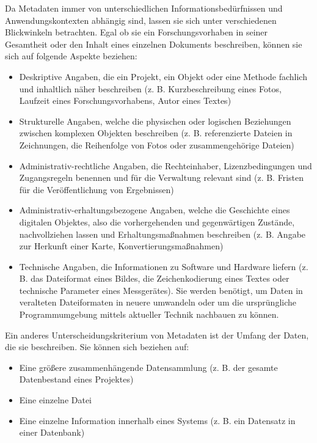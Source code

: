 Da Metadaten immer von unterschiedlichen Informationsbedürfnissen und Anwendungskontexten abhängig sind, lassen sie sich unter verschiedenen Blickwinkeln betrachten. Egal ob sie ein Forschungsvorhaben in seiner Gesamtheit oder den Inhalt eines einzelnen Dokuments beschreiben, können sie sich auf folgende Aspekte beziehen:
\begin{itemize}
	\item Deskriptive Angaben, die ein Projekt, ein Objekt oder eine Methode fachlich und inhaltlich näher beschreiben (z. B. Kurzbeschreibung eines Fotos, Laufzeit eines Forschungsvorhabens, Autor eines Textes)
	\item Strukturelle Angaben, welche die physischen oder logischen Beziehungen zwischen komplexen Objekten beschreiben (z. B. referenzierte Dateien in Zeichnungen, die Reihenfolge von Fotos oder zusammengehörige Dateien)
	\item Administrativ-rechtliche Angaben, die Rechteinhaber, Lizenzbedingungen und Zugangsregeln benennen und für die Verwaltung relevant sind (z. B. Fristen für die Veröffentlichung von Ergebnissen)
	\item Administrativ-erhaltungsbezogene Angaben, welche die Geschichte eines digitalen Objektes, also die  vorhergehenden und gegenwärtigen Zustände, nachvollziehen lassen und Erhaltungsmaßnahmen beschreiben (z. B. Angabe zur Herkunft einer Karte, Konvertierungsmaßnahmen)
	\item Technische Angaben, die Informationen zu Software und Hardware liefern (z. B. das Dateiformat eines Bildes, die Zeichenkodierung eines Textes oder technische Parameter eines Messgerätes). Sie werden benötigt, um Daten in veralteten Dateiformaten in neuere umwandeln oder um die ursprüngliche Programmumgebung mittels aktueller Technik nachbauen zu können.
\end{itemize}

Ein anderes Unterscheidungskriterium von Metadaten ist der Umfang der Daten, die sie beschreiben. Sie können sich beziehen auf:
\begin{itemize}
	\item Eine größere zusammenhängende Datensammlung (z. B. der gesamte Datenbestand eines Projektes)
	\item Eine einzelne Datei
	\item Eine einzelne Information innerhalb eines Systems (z. B. ein Datensatz in einer Datenbank)
\end{itemize}

